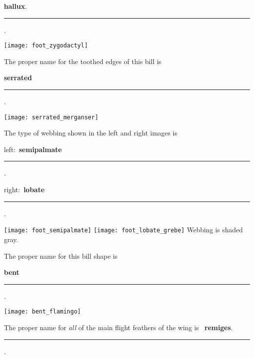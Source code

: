 \documentclass[12pt, addpoints]{exam}
\begin{document}
\begin{questions}
\begin{multicols}{2}
	\bigskip
	
	 \ifprintanswers \textbf{hallux}. \else \rule{2.5in}{0.4pt}. \fi
	
	\columnbreak
	\texttt{[image: foot\_zygodactyl]}
\end{multicols}


\begin{multicols}{2} \raggedcolumns
	\question
	The proper name for the toothed edges of \newline 	
	this bill is
	
	\bigskip
	
	\ifprintanswers \textbf{serrated} \else \rule{2.5in}{0.4pt}. \fi
		
	\columnbreak
	\texttt{[image: serrated\_merganser]}
\end{multicols}


\begin{multicols}{2} \raggedcolumns
	\question
	The type of webbing shown in the left and right images is 
	
	\bigskip
	
	left:~\ifprintanswers \textbf{semipalmate} \else \rule{2.5in}{0.4pt}. \fi
	
	\bigskip
	
	right:~\ifprintanswers \textbf{lobate} \else \rule{2.5in}{0.4pt}. \fi
	
	\columnbreak
	\texttt{[image: foot\_semipalmate]} \texttt{[image: foot\_lobate\_grebe]}\newline
	{\footnotesize Webbing is shaded gray. }
\end{multicols}


\newpage

\begin{multicols}{2} \raggedcolumns
	\question
	The proper name for this bill shape is
	
	\bigskip \bigskip
	
	\ifprintanswers \textbf{bent} \else \rule{2.5in}{0.4pt}. \fi
	
	\columnbreak
	\texttt{[image: bent\_flamingo]}
\end{multicols}

\vspace{2\baselineskip}

\question
The proper name for \textit{all} of the main flight feathers of the wing is ~\ifprintanswers \textbf{remiges}. \else \rule{2.25in}{0.4pt}. \fi

\vspace{2\baselineskip}


\end{questions}
\end{document}
